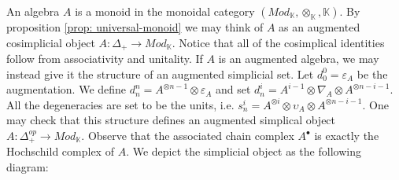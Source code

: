 \documentclass[../thesis.tex]{subfiles}
\begin{document}

            An algebra $A$ is a monoid in the monoidal category $(Mod_\mathbb{K}, \otimes_\mathbb{K}, \mathbb{K})$. By proposition \ref{prop: universal-monoid} we may think of $A$ as an augmented cosimplicial object $A:\Delta_+ \rightarrow Mod_\mathbb{K}$. Notice that all of the cosimplical identities follow from associativity and unitality. If $A$ is an augmented algebra, we may instead give it the structure of an augmented simplicial set. Let $d^0_0 = \varepsilon_A$ be the augmentation. We define $d^n_n = A^{\otimes n-1}\otimes\varepsilon_A$ and set $d^i_n = A^{i-1}\otimes \nabla_A \otimes A^{\otimes n-i-1}$. All the degeneracies are set to be the units, i.e. $s^i_n = A^{\otimes i}\otimes \upsilon_A \otimes A^{\otimes n-i-1}$. One may check that this structure defines an augmented simplical object $A:\Delta_+^{op}\rightarrow Mod_\mathbb{K}$. Observe that the associated chain complex $A^\bullet$ is exactly the Hochschild complex of $A$. We depict the simplicial object as the following diagram:
            \begin{center}

            \end{center}
\end{document}
